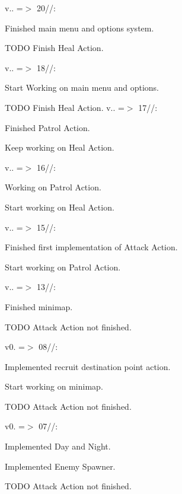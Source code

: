 v.. =\texorpdfstring{$>$}{>} 20//:\+
\begin{DoxyItemize}
\item Finished main menu and options system.
\item TODO Finish Heal Action.
\end{DoxyItemize}

v.. =\texorpdfstring{$>$}{>} 18//:\+
\begin{DoxyItemize}
\item Start Working on main menu and options.
\item TODO Finish Heal Action. v.. =\texorpdfstring{$>$}{>} 17//:\+
\item Finished Patrol Action.
\item Keep working on Heal Action.
\end{DoxyItemize}

v.. =\texorpdfstring{$>$}{>} 16//:\+
\begin{DoxyItemize}
\item Working on Patrol Action.
\item Start working on Heal Action.
\end{DoxyItemize}

v.. =\texorpdfstring{$>$}{>} 15//:\+
\begin{DoxyItemize}
\item Finished first implementation of Attack Action.
\item Start working on Patrol Action.
\end{DoxyItemize}

v.. =\texorpdfstring{$>$}{>} 13//:\+
\begin{DoxyItemize}
\item Finished minimap.
\item TODO Attack Action not finished.
\end{DoxyItemize}

v0. =\texorpdfstring{$>$}{>} 08//:\+
\begin{DoxyItemize}
\item Implemented recruit destination point action.
\item Start working on minimap.
\item TODO Attack Action not finished.
\end{DoxyItemize}

v0. =\texorpdfstring{$>$}{>} 07//:\+
\begin{DoxyItemize}
\item Implemented Day and Night.
\item Implemented Enemy Spawner.
\item TODO Attack Action not finished.
\end{DoxyItemize}

